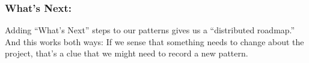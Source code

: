 \subsubsection*{What's Next:} 
Adding ``What's Next'' steps to our patterns gives us a ``distributed
roadmap.''  And this works both ways: If we sense that something needs
to change about the project, that's a clue that we might need to
record a new pattern.
